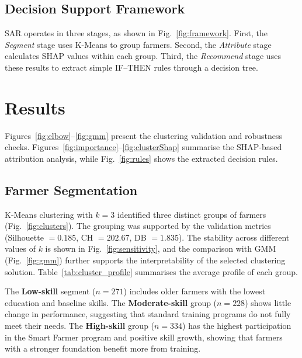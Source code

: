 \documentclass[fleqn,10pt,lineno]{wlpeerj}
\begin{document}
\subsection{Decision Support Framework}
SAR operates in three stages, as shown in Fig.~\ref{fig:framework}. First, the \textit{Segment} stage uses K-Means to group farmers. Second, the \textit{Attribute} stage calculates SHAP values within each group. Third, the \textit{Recommend} stage uses these results to extract simple IF--THEN rules through a decision tree.

\section{Results}

Figures~\ref{fig:elbow}--\ref{fig:gmm} present the clustering validation and robustness checks. Figures~\ref{fig:importance}--\ref{fig:clusterShap} summarise the SHAP-based attribution analysis, while Fig.~\ref{fig:rules} shows the extracted decision rules.

\subsection{Farmer Segmentation}
K-Means clustering with $k=3$ identified three distinct groups of farmers (Fig.~\ref{fig:clusters}). The grouping was supported by the validation metrics (Silhouette $= 0.185$, CH $= 202.67$, DB $= 1.835$). The stability across different values of $k$ is shown in Fig.~\ref{fig:sensitivity}, and the comparison with GMM (Fig.~\ref{fig:gmm}) further supports the interpretability of the selected clustering solution. Table~\ref{tab:cluster_profile} summarises the average profile of each group.

The \textbf{Low-skill} segment ($n=271$) includes older farmers with the lowest education and baseline skills. The \textbf{Moderate-skill} group ($n=228$) shows little change in performance, suggesting that standard training programs do not fully meet their needs. The \textbf{High-skill} group ($n=334$) has the highest participation in the Smart Farmer program and positive skill growth, showing that farmers with a stronger foundation benefit more from training.
\end{document}
